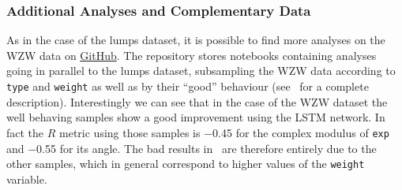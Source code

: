 \subsubsection{Additional Analyses and Complementary Data}

As in the case of the lumps dataset, it is possible to find more analyses on the WZW data on \href{https://github.com/thesfinox/ml-sft-trunc/tree/model-dep}{GitHub}.
The repository stores notebooks containing analyses going in parallel to the lumps dataset, subsampling the WZW data according to \texttt{type} and \texttt{weight} as well as by their ``good'' behaviour (see~ for a complete description).\footnotemark{}
Interestingly we can see that in the case of the WZW dataset the well behaving samples show a good improvement using the LSTM network.
In fact the $R$ metric using those samples is \num{-0.45} for the complex modulus of \texttt{exp} and \num{-0.55} for its angle.
The bad results in~ are therefore entirely due to the other samples, which in general correspond to higher values of the \texttt{weight} variable.

